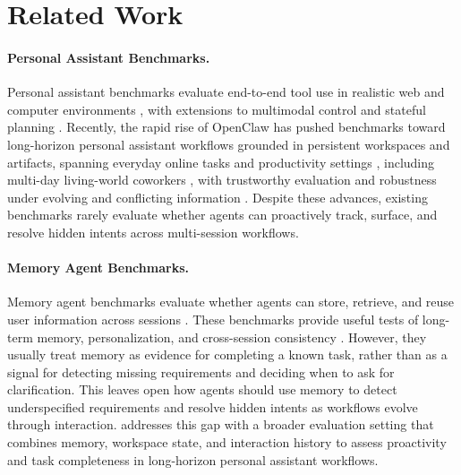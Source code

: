 
\section{Related Work}
\label{sec:related_work}

\paragraph{Personal Assistant Benchmarks.}
Personal assistant benchmarks evaluate end-to-end tool use in realistic web and computer environments \citep{mialon2023gaia,zhou2023webarena,drouin2024workarena}, with extensions to multimodal control and stateful planning \citep{xie2024osworld,malay2026enterpriseops}.
Recently, the rapid rise of OpenClaw \citep{openclaw} has pushed benchmarks toward long-horizon personal assistant workflows grounded in persistent workspaces and artifacts, spanning everyday online tasks and productivity settings \citep{zhang2026clawbench,li2026clawsbench}, including multi-day living-world coworkers \citep{clawmark}, with trustworthy evaluation \citep{ye2026claw} and robustness under evolving and conflicting information \citep{ji2026clawarena}.
Despite these advances, existing benchmarks rarely evaluate whether agents can proactively track, surface, and resolve hidden intents across multi-session workflows.

\paragraph{Memory Agent Benchmarks.}
Memory agent benchmarks evaluate whether agents can store, retrieve, and reuse user information across sessions \citep{shen2026mem2actbench,liu2026memgui,zhang2026memorycd}.
These benchmarks provide useful tests of long-term memory, personalization, and cross-session consistency \citep{he2026memoryarena,kim2026persona2web,liu2026perma}.
However, they usually treat memory as evidence for completing a known task, rather than as a signal for detecting missing requirements and deciding when to ask for clarification.
This leaves open how agents should use memory to detect underspecified requirements and resolve hidden intents as workflows evolve through interaction.
{\bench} addresses this gap with a broader evaluation setting that combines memory, workspace state, and interaction history to assess proactivity and task completeness in long-horizon personal assistant workflows.

